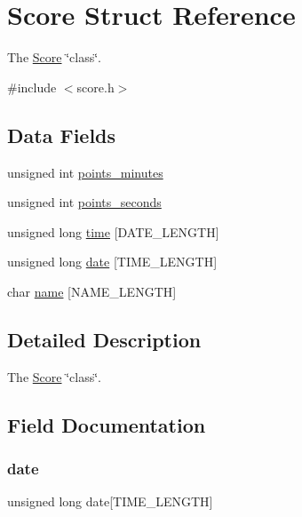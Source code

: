 \hypertarget{struct_score}{}\section{Score Struct Reference}
\label{struct_score}


The \hyperlink{struct_score}{Score} \char`\"{}class\char`\"{}.  




{\ttfamily \#include $<$score.\+h$>$}

\subsection*{Data Fields}
\begin{DoxyCompactItemize}
\item 
unsigned int \hyperlink{struct_score_aa9526a2102bea713152f51e494eaaecb}{points\+\_\+minutes}
\item 
unsigned int \hyperlink{struct_score_a0eb13288839bf311a839235768f7e26c}{points\+\_\+seconds}
\item 
unsigned long \hyperlink{struct_score_ae9f072d0deb7c6120bb575d62e5bc5c3}{time} \mbox{[}D\+A\+T\+E\+\_\+\+L\+E\+N\+G\+TH\mbox{]}
\item 
unsigned long \hyperlink{struct_score_a8962e3d860b68ad109df42a45928b585}{date} \mbox{[}T\+I\+M\+E\+\_\+\+L\+E\+N\+G\+TH\mbox{]}
\item 
char \hyperlink{struct_score_a89a88337d531d6b5590602d97b5df8c0}{name} \mbox{[}N\+A\+M\+E\+\_\+\+L\+E\+N\+G\+TH\mbox{]}
\end{DoxyCompactItemize}


\subsection{Detailed Description}
The \hyperlink{struct_score}{Score} \char`\"{}class\char`\"{}. 

\subsection{Field Documentation}
\hypertarget{struct_score_a8962e3d860b68ad109df42a45928b585}{}\label{struct_score_a8962e3d860b68ad109df42a45928b585} 
\subsubsection{\texorpdfstring{date}{date}}
{\footnotesize\ttfamily unsigned long date\mbox{[}T\+I\+M\+E\+\_\+\+L\+E\+N\+G\+TH\mbox{]}}

